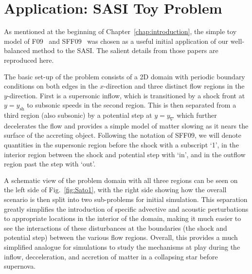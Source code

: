 \chapter{Application: SASI Toy Problem}
\label{chap:application}

As mentioned at the beginning of Chapter~\ref{chap:introduction}, the simple toy model of F09~\cite{Foglizzo2009} and SFF09~\cite{Sato2009} was chosen as a useful initial application of our well-balanced method to the SASI. The salient details from those papers are reproduced here.

The basic set-up of the problem consists of a 2D domain with periodic boundary conditions on both edges in the $x$-direction and three distinct flow regions in the $y$-direction. First is a supersonic inflow, which is transitioned by a shock front at $y=y_\textrm{sh}$ to subsonic speeds in the second region. This is then separated from a third region (also subsonic) by a potential step at $y=y_\nabla$ which further decelerates the flow and provides a simple model of matter slowing as it nears the surface of the accreting object. Following the notation of SFF09, we will denote quantities in the supersonic region before the shock with a subscript `1', in the interior region between the shock and potential step with `in', and in the outflow region past the step with `out'.

A schematic view of the problem domain with all three regions can be seen on the left side of Fig.~\ref{fig:Sato1}, with the right side showing how the overall scenario is then split into two sub-problems for initial simulation. This separation greatly simplifies the introduction of specific advective and acoustic perturbations to appropriate locations in the interior of the domain, making it much easier to see the interactions of these disturbances at the boundaries (the shock and potential step) between the various flow regions. Overall, this provides a much simplified analogue for simulations to study the mechanisms at play during the inflow, decceleration, and accretion of matter in a collapsing star before supernova.

